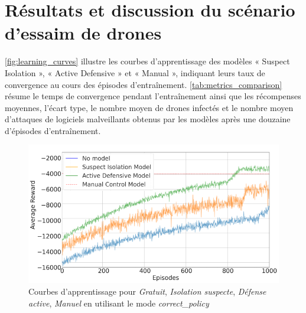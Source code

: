 \section{Résultats et discussion du scénario d'essaim de drones}\label{sec:results_and_discussion_essaim}

\autoref{fig:learning_curves} illustre les courbes d'apprentissage des modèles « Suspect Isolation », « Active Defensive » et « Manual », indiquant leurs taux de convergence au cours des épisodes d'entraînement.
\autoref{tab:metrics_comparison} résume le temps de convergence pendant l'entraînement ainsi que les récompenses moyennes, l'écart type, le nombre moyen de drones infectés et le nombre moyen d'attaques de logiciels malveillants obtenus par les modèles après une douzaine d'épisodes d'entraînement.

\begin{figure}[ht]
  \centering
  \includegraphics[width=1\linewidth]{figures/learning_curves.png}
  \caption{Courbes d'apprentissage pour \textit{Gratuit}, \textit{Isolation suspecte}, \textit{Défense active}, \textit{Manuel} en utilisant le mode \textit{correct\_policy} }
  \label{fig:learning_curves}
\end{figure}

